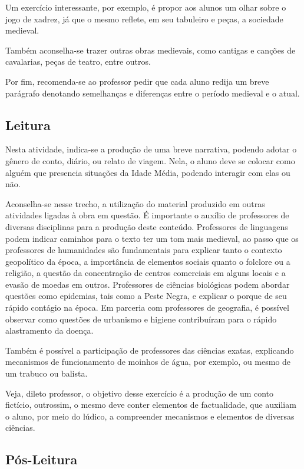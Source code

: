 \documentclass[12pt]{extarticle}
\begin{document}
Um exercício interessante, por exemplo, é propor aos alunos um olhar
sobre o jogo de xadrez, já que o mesmo reflete, em seu tabuleiro e
peças, a sociedade medieval.

Também aconselha-se trazer outras obras medievais, como cantigas e
canções de cavalarias, peças de teatro, entre outros.

Por fim, recomenda-se ao professor pedir que cada aluno redija um breve
parágrafo denotando semelhanças e diferenças entre o período medieval e
o atual.

\subsection{Leitura}

Nesta atividade, indica-se a produção de uma breve
narrativa, podendo adotar o gênero de conto, diário, ou relato de
viagem. Nela, o aluno deve se colocar como alguém que presencia
situações da Idade Média, podendo interagir com elas ou não.

Aconselha-se nesse trecho, a utilização do material produzido em outras
atividades ligadas à obra em questão. É importante o auxílio de
professores de diversas disciplinas para a produção deste conteúdo.
Professores de linguagens podem indicar caminhos para o texto ter um tom
mais medieval, ao passo que os professores de humanidades são
fundamentais para explicar tanto o contexto geopolítico da época, a
importância de elementos sociais quanto o folclore ou a religião, a
questão da concentração de centros comerciais em alguns locais e a
evasão de moedas em outros. Professores de ciências biológicas podem
abordar questões como epidemias, tais como a Peste Negra, e explicar o
porque de seu rápido contágio na época. Em parceria com professores de
geografia, é possível observar como questões de urbanismo e higiene
contribuíram para o rápido alastramento da doença.

Também é possível a participação de professores das ciências exatas,
explicando mecanismos de funcionamento de moinhos de água, por exemplo,
ou mesmo de um trabuco ou balista.

Veja, dileto professor, o objetivo desse exercício é a produção de um
conto fictício, outrossim, o mesmo deve conter elementos de
factualidade, que auxiliam o aluno, por meio do lúdico, a compreender
mecanismos e elementos de diversas ciências.

\subsection{Pós-Leitura}
\end{document}
